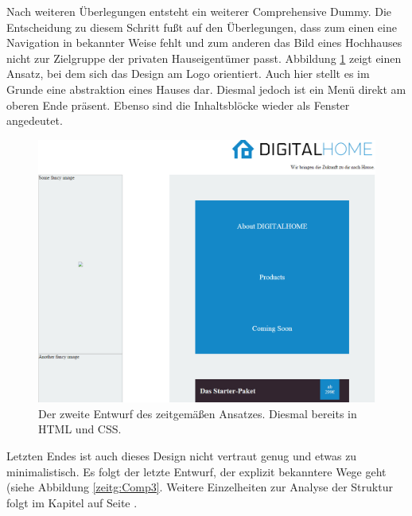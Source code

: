 Nach weiteren Überlegungen entsteht ein weiterer Comprehensive Dummy. Die Entscheidung zu diesem Schritt fußt auf den Überlegungen, dass zum einen eine Navigation in bekannter Weise fehlt und zum anderen das Bild eines Hochhauses nicht zur Zielgruppe der privaten Hauseigentümer passt.
Abbildung \ref{zeitg:Comp2} zeigt einen Ansatz, bei dem sich das Design am Logo orientiert. Auch hier stellt es im Grunde eine abstraktion eines Hauses dar. Diesmal jedoch ist ein Menü direkt am oberen Ende präsent. Ebenso sind die Inhaltsblöcke wieder als Fenster angedeutet.

\begin{figure} [hp]
	\includegraphics[width=\textwidth]{./img/zeitg_comp2.png}
	\caption{Der zweite Entwurf des zeitgemäßen Ansatzes. Diesmal bereits in HTML und CSS.}
	\label{zeitg:Comp2}
\end{figure}

Letzten Endes ist auch dieses Design nicht vertraut genug und etwas zu minimalistisch. Es folgt der letzte Entwurf, der explizit bekanntere Wege geht (siehe Abbildung \ref{zeitg:Comp3}. Weitere Einzelheiten zur Analyse der Struktur folgt im Kapitel  auf Seite \pageref{zeitg:struktur}.

